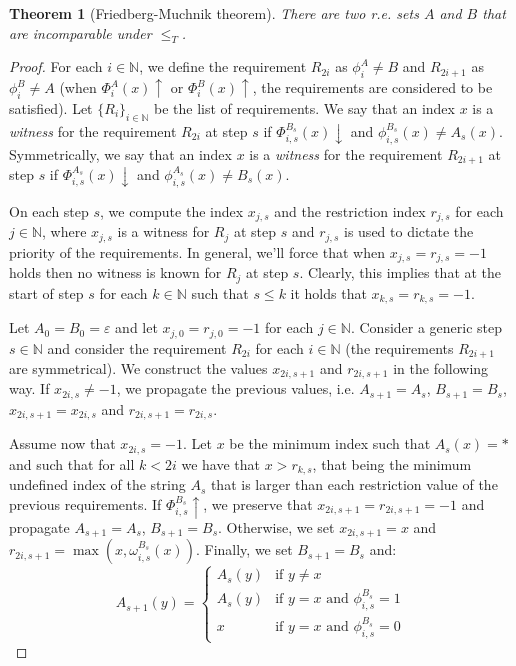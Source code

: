 \documentclass[12pt,a4paper]{article}
\newtheorem{theorem}{Theorem}
\theoremstyle{definition}
\newcommand{\N}{\mathbb{N}}                     %
\begin{document}
    \begin{theorem}[Friedberg-Muchnik theorem]
        There are two r.e. sets $A$ and $B$ that are incomparable under $\leq_T$.
    \end{theorem}

    \begin{proof}
        For each $i \in \N$, we define the requirement $R_{2i}$ as $\phi_i^A \neq B$ and $R_{2i+1}$ as $\phi_{i}^B \neq A$ (when $\Phi_i^A(x) \uparrow$ or $\Phi_i^B(x) \uparrow$, the requirements are considered to be satisfied). Let $\{R_i\}_{i \in \N}$ be the list of requirements. We say that an index $x$ is a \textit{witness} for the requirement $R_{2i}$ at step $s$ if $\Phi_{i,s}^{B_s}(x) \downarrow$ and $\phi_{i,s}^{B_s}(x) \neq A_s(x)$. Symmetrically, we say that an index $x$ is a \textit{witness} for the requirement $R_{2i+1}$ at step $s$ if $\Phi_{i,s}^{A_s}(x) \downarrow$ and $\phi_{i,s}^{A_s}(x) \neq B_s(x)$.

        On each step $s$, we compute the index $x_{j,s}$ and the restriction index $r_{j,s}$ for each $j \in \N$, where $x_{j,s}$ is a witness for $R_j$ at step $s$ and $r_{j,s}$ is used to dictate the priority of the requirements. In general, we'll force that when $x_{j,s} = r_{j,s} = -1$ holds then no witness is known for $R_j$ at step $s$. Clearly, this implies that at the start of step $s$ for each $k \in \N$ such that $s \leq k$ it holds that $x_{k,s} = r_{k,s} = -1$.

        Let $A_0 = B_0 = \varepsilon$ and let $x_{j,0} = r_{j,0} = -1$ for each $j \in \N$. Consider a generic step $s \in \N$ and consider the requirement $R_{2i}$ for each $i \in \N$ (the requirements $R_{2i+1}$ are symmetrical). We construct the values $x_{2i,s+1}$ and $r_{2i,s+1}$ in the following way. If $x_{2i,s} \neq -1$, we propagate the previous values, i.e. $A_{s+1} = A_s$, $B_{s+1} = B_s$, $x_{2i,s+1} = x_{2i,s}$ and $r_{2i,s+1} = r_{2i,s}$.

        Assume now that $x_{2i,s} = -1$. Let $x$ be the minimum index such that $A_s(x) = *$ and such that for all $k < 2i$ we have that $x > r_{k,s}$, that being the minimum undefined index of the string $A_s$ that is larger than each restriction value of the previous requirements. If $\Phi_{i,s}^{B_s} \uparrow$, we preserve that $x_{2i,s+1} = r_{2i,s+1} = -1$ and propagate $A_{s+1} = A_s$, $B_{s+1} = B_s$. Otherwise, we set $x_{2i,s+1} = x$ and $r_{2i,s+1} = \max(x, \omega_{i,s}^{B_s}(x))$. Finally, we set $B_{s+1} = B_s$ and:
        \[A_{s+1}(y) = \left \{ \begin{array}{ll}
            A_{s}(y)  & \text{if } y \neq x \\
            A_s(y) & \text{if } y = x \text{ and }  \phi_{i,s}^{B_s} = 1 \\
            x & \text{if } y = x \text{ and }  \phi_{i,s}^{B_s} = 0
        \end{array}\right .\]


\end{proof}
\end{document}
